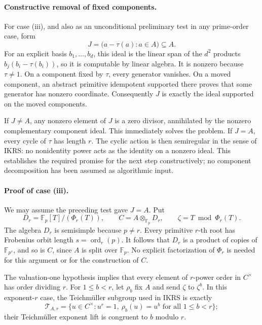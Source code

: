 \paragraph{Constructive removal of fixed components.}
For case (iii), and also as an unconditional preliminary test in
any prime-order case, form
\[
 J=\bigl(a-\tau(a):a\in A\bigr)\subseteq A.
\]
For an explicit basis \(b_1,\ldots,b_d\), this ideal is the linear
span of the \(d^2\) products
\(b_j(b_i-\tau(b_i))\), so it is computable by linear algebra.
It is nonzero because \(\tau\ne1\).
On a component fixed by \(\tau\), every generator vanishes.
On a moved component, an abstract primitive idempotent supported
there proves that some generator has nonzero coordinate.
Consequently \(J\) is exactly the ideal supported on the moved
components.

If \(J\ne A\), any nonzero element of \(J\) is a zero divisor,
annihilated by the nonzero complementary component ideal.
This immediately solves the problem.
If \(J=A\), every cycle of \(\tau\) has length \(r\).
The cyclic action is then semiregular in the sense of IKRS:
no nonidentity power acts as the identity on a nonzero ideal.
This establishes the required promise for the next step
constructively; no component decomposition has been assumed as
algorithmic input.

\paragraph{Proof of case (iii).}
We may assume the preceding test gave \(J=A\).
Put
\[
 D_r=\mathbb F_p[T]/(\Phi_r(T)),\qquad
 C=A\otimes_{\mathbb F_p}D_r,\qquad
 \zeta=T\bmod\Phi_r(T).
\]
The algebra \(D_r\) is semisimple because \(p\ne r\).
Every primitive \(r\)-th root has Frobenius orbit length
\(s=\operatorname{ord}_r(p)\).
It follows that \(D_r\) is a product of copies of
\(\mathbb F_{p^s}\), and so is \(C\), since \(A\) is split over
\(\mathbb F_p\).
No explicit factorization of \(\Phi_r\) is needed for this argument
or for the construction of \(C\).

The valuation-one hypothesis implies that every element of
\(r\)-power order in \(C^\times\) has order dividing \(r\).
For \(1\leq b<r\), let \(\rho_b\) fix \(A\) and send
\(\zeta\) to \(\zeta^b\).
In this exponent-\(r\) case, the Teichm\"uller subgroup used in IKRS
is exactly
\[
 \mathcal T_{A,r}
 =\{u\in C^\times:u^r=1,\ 
          \rho_b(u)=u^b\text{ for all }1\leq b<r\};
\]
their Teichm\"uller exponent lift is congruent to \(b\) modulo \(r\).

